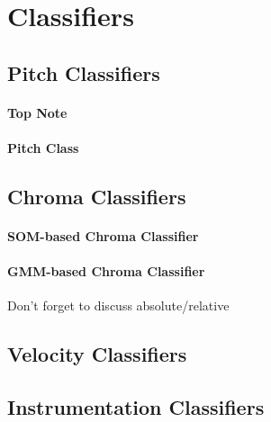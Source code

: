\section{Classifiers}\label{sec:3-classifiers}

\subsection{Pitch Classifiers}\label{sec:3-classifiers-pitch}
\paragraph{Top Note}
\paragraph{Pitch Class}

\subsection{Chroma Classifiers}\label{sec:3-classifiers-chroma}
\paragraph{SOM-based Chroma Classifier}
\paragraph{GMM-based Chroma Classifier}
Don't forget to discuss absolute/relative

\subsection{Velocity Classifiers}\label{sec:3-classifiers-velocity}

\subsection{Instrumentation Classifiers}\label{sec:3-classifiers-mfcc}
